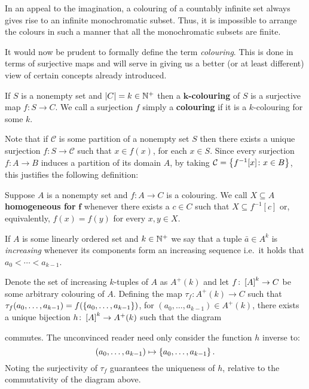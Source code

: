 In an appeal to the imagination, a colouring of a countably infinite set always
gives rise to an infinite monochromatic subset.  Thus, it is impossible to
arrange the colours in such a manner that all the monochromatic subsets are
finite.

It would now be prudent to formally define the term \textit{colouring}.  This is
done in terms of surjective maps and will serve in giving us a better (or at
least different) view of certain concepts already introduced.

\begin{dfn}[Colouring]\label{def:Col}
	If $S$ is a nonempty set and $\card{C}=k\in\posnats$ then a
	$\mathbf{k}$\textbf{-colouring} of $S$ is a surjective map $f\colon  S\to
		C$.  We call a surjection $f$ simply a \textbf{colouring} if it is a
	$k$-colouring for some $k$.
\end{dfn}

Note that if $\mathcal{C}$ is some partition of a nonempty set $S$ then there
exists a unique surjection $f\colon S\to \mathcal{C}$ such that $x\in f(x)$, for
each $x\in S$. Since every surjection $f\colon A\to B$ induces a partition of
its domain $A$, by taking $\mathcal{C}=\setbuild{f^{-1}[x]}{x\in B}$, this
justifies the following definition:

\begin{dfn}
	Suppose $A$ is a nonempty set and $f\colon A\to C$ is a colouring.  We call
	$X\subseteq A$ \textbf{homogeneous for} $\bm{f}$ whenever there exists a $c\in
		C$ such that $X\subseteq f^{-1}[c]$ or, equivalently, $f(x)=f(y)$ for every
	$x,y\in X$.
\end{dfn}

If $A$ is some linearly ordered set and $k\in\posnats$ we say that a tuple
$\bar{a}\in A^k$ is \textit{increasing} whenever its components form an
increasing sequence i.e.\ it holds that $a_0<\dotsb<a_{k-1}$.

Denote the set of increasing $k$-tuples of $A$ as $A^+(k)$ and let $f\colon
	\subsets{k}{A}\to C$ be some arbitrary colouring of $A$.  Defining the map
$\tau_f\colon A^+(k)\to C$ such that
$\tau_f(a_0,\dotsc,a_{k-1})=f(\set{a_0,\dotsc,a_{k-1}})$, for
$(a_0,\dotsc,a_{k-1})\in A^+(k)$, there exists a unique bijection $h\colon
	\subsets{k}{A}\to A^+(k)$ such that the diagram
\begin{center}
\end{center}
commutes.  The unconvinced reader need only consider the function $h$ inverse
to:
\begin{equation}
	(a_0,\dotsc,a_{k-1})\mapsto\set{a_0,\dotsc,a_{k-1}}.
\end{equation}
Noting the surjectivity of $\tau_f$ guarantees the uniqueness of $h$,
relative to the commutativity of the diagram above.

